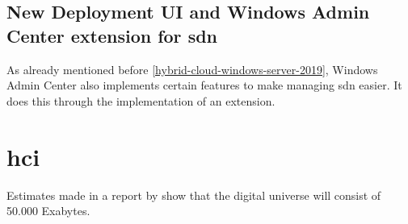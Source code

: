 \subsection*{New Deployment UI and Windows Admin Center extension for \acrshort{sdn}}
As already mentioned before \ref{hybrid-cloud-windows-server-2019}, Windows Admin Center also implements certain features to make managing \acrshort{sdn} easier. It does this through the implementation of an extension.

\section{\acrfull{hci}}
Estimates made in a report by \textcite{Gantz2012} show that the digital universe will consist of 50.000 Exabytes.



%
%
%

